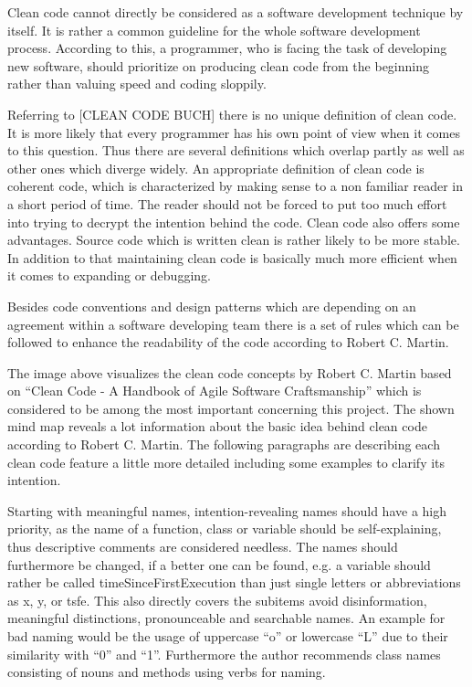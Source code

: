 Clean code cannot directly be considered as a software development technique by itself. It is rather a common guideline for the whole 
software development process. According to this, a programmer, who is facing the task of developing new software, should prioritize on 
producing clean code from the beginning rather than valuing speed and coding sloppily.

Referring to [CLEAN CODE BUCH] there is no unique definition of clean code. It is more likely that every programmer has his own point of 
view when it comes to this question. Thus there are several definitions which overlap partly as well as other ones which diverge widely. 
An appropriate definition of clean code is coherent code, which is characterized by making sense to a non familiar reader in a short period 
of time. The reader should not be forced to put too much effort into trying to decrypt the intention behind the code. Clean code also offers 
some advantages. Source code which is written clean is rather likely to be more stable. In addition to that maintaining clean code is basically 
much more efficient when it comes to expanding or debugging.

Besides code conventions and design patterns which are depending on an agreement within a software developing team there is a set of rules
which can be followed to enhance the readability of the code according to Robert C. Martin.


The image above visualizes the clean code concepts by Robert C. Martin based on “Clean Code - A Handbook of Agile Software Craftsmanship” 
which is considered to be among the most important concerning this project. The shown mind map reveals a lot information about the basic 
idea behind clean code according to Robert C. Martin. The following paragraphs are describing each clean code feature a little more detailed 
including some examples to clarify its intention.

Starting with meaningful names, intention-revealing names should have a high priority, as the name of a function, class or variable should 
be self-explaining, thus descriptive comments are considered needless. The names should furthermore be changed, if a better one can be found, 
e.g. a variable should rather be called timeSinceFirstExecution than just single letters or abbreviations as x, y, or tsfe. This also directly 
covers the subitems avoid disinformation, meaningful distinctions, pronounceable and searchable names. An example for bad naming would be the 
usage of uppercase “o” or lowercase “L” due to their similarity with “0” and “1”. Furthermore the author recommends class names consisting of 
nouns and methods using verbs for naming.

